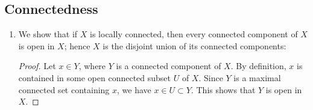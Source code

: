 \documentclass{book}
\begin{document}
\subsection{Connectedness}
\begin{enumerate}[(1)]
    \item We show that if $X$ is locally connected, then every connected component of $X$ is open in $X$; hence $X$ is the disjoint union of its connected components:
        \begin{proof} Let $x \in Y$, where $Y$ is a connected component of $X$. By definition, $x$ is contained in some open connected subset $U$ of $X$. Since $Y$ is a maximal connected set containing $x$, we have $x \in U \subset Y$. This shows that $Y$ is open in $X$.
        \end{proof}
\end{enumerate}
\end{document}
